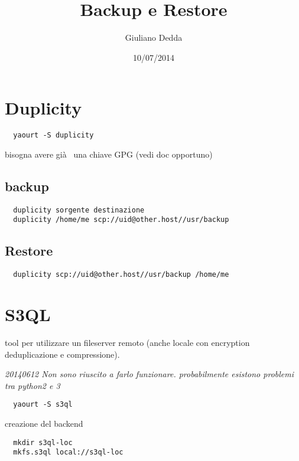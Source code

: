 \documentclass[]{article}
\title{Backup e Restore}
\author{Giuliano Dedda}
\date{10/07/2014}
\begin{document}
\maketitle

\section{Duplicity}\label{duplicity}

\begin{verbatim}
  yaourt -S duplicity
\end{verbatim}

bisogna avere già~ una chiave GPG (vedi doc opportuno)

\subsection{backup}\label{backup}

\begin{verbatim}
  duplicity sorgente destinazione
  duplicity /home/me scp://uid@other.host//usr/backup
\end{verbatim}

\subsection{Restore}\label{restore}

\begin{verbatim}
  duplicity scp://uid@other.host//usr/backup /home/me
\end{verbatim}

\section{S3QL}\label{s3ql}

tool per utilizzare un fileserver remoto (anche locale con encryption
deduplicazione e compressione).

\emph{20140612 Non sono riuscito a farlo funzionare. probabilmente
esistono problemi tra python2 e 3}

\begin{verbatim}
  yaourt -S s3ql
\end{verbatim}

creazione del backend

\begin{verbatim}
  mkdir s3ql-loc
  mkfs.s3ql local://s3ql-loc
\end{verbatim}
\end{document}
